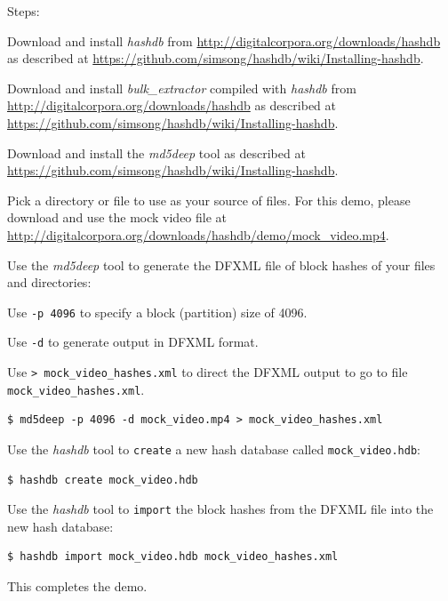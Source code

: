 \documentclass[12pt,twoside]{article}
\newcommand{\hdb}{\emph{hashdb}\xspace}
\newcommand{\bulk}{\emph{bulk\_extractor}\xspace}
\newcommand{\mdd}{\emph{md5deep}\xspace}
\begin{document}
Steps:
\begin{compactenum}
\item Download and install \hdb from
\url{http://digitalcorpora.org/downloads/hashdb}
as described at
\url{https://github.com/simsong/hashdb/wiki/Installing-hashdb}.
\item Download and install \bulk compiled with \hdb from
\url{http://digitalcorpora.org/downloads/hashdb}
as described at
\url{https://github.com/simsong/hashdb/wiki/Installing-hashdb}.
\item Download and install the \mdd tool as described at
\url{https://github.com/simsong/hashdb/wiki/Installing-hashdb}.
\item Pick a directory or file to use
as your source of files.
For this demo, please download and use the mock video file at
\url{http://digitalcorpora.org/downloads/hashdb/demo/mock\_video.mp4}.

\item Use the \mdd tool to generate the DFXML file of block hashes
of your files and directories:
\begin{compactitem}
\item Use \texttt{-p 4096} to specify a block (partition) size of 4096.
\item Use \texttt{-d} to generate output in DFXML format.
\item Use \texttt{> mock\_video\_hashes.xml} to direct the DFXML output
to go to file \\
\texttt{mock\_video\_hashes.xml}.
\end{compactitem}
\begin{verbatim}
$ md5deep -p 4096 -d mock_video.mp4 > mock_video_hashes.xml
\end{verbatim}

\item Use the \hdb tool to \texttt{create} a new hash database
called \texttt{mock\_video.hdb}:
\begin{verbatim}
$ hashdb create mock_video.hdb
\end{verbatim}

\item Use the \hdb tool to \texttt{import} the block hashes
from the DFXML file into the new hash database:
\begin{verbatim}
$ hashdb import mock_video.hdb mock_video_hashes.xml
\end{verbatim}
\end{compactenum}

This completes the demo.
\end{document}
